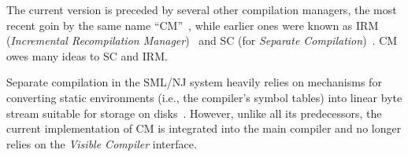 \documentclass{article}
\begin{document}
The current version is preceded by several other compilation managers,
the most recent goin by the same name ``CM''~\cite{blume95:cm}, while
earlier ones were known as IRM ({\it Incremental Recompilation
Manager})~\cite{harper94:irm} and SC (for {\it Separate
Compilation})~\cite{harper-lee-pfenning-rollins-CM}.  CM owes many
ideas to SC and IRM.

Separate compilation in the SML/NJ system heavily relies on mechanisms
for converting static environments (i.e., the compiler's symbol
tables) into linear byte stream suitable for storage on
disks~\cite{appel94:sepcomp}.  However, unlike all its predecessors,
the current implementation of CM is integrated into the main compiler
and no longer relies on the {\em Visible Compiler} interface.

\cleardoublepage

\tableofcontents

\pagebreak


\end{document}
